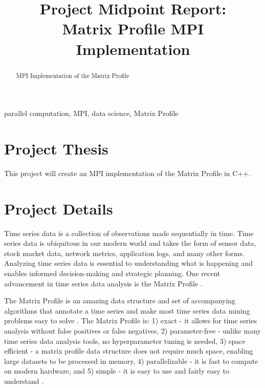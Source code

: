 \documentclass[conference]{IEEEtran}
\begin{document}
\title{Project Midpoint Report:\\Matrix Profile MPI Implementation}

\author{
}


\maketitle
\begin{abstract}
MPI Implementation of the Matrix Profile
\end{abstract}

\begin{IEEEkeywords}
parallel computation, MPI, data science, Matrix Profile
\end{IEEEkeywords}

\section{Project Thesis}
This project will create an MPI implementation of the Matrix Profile in C++.

\section{Project Details}
Time series data is a collection of observations made sequentially in time.  Time series data is ubiquitous in our modern world and takes the form of sensor data, stock market data, network metrics, application logs, and many other forms.  Analyzing time series data is essential to understanding what is happening and enables informed decision-making and strategic planning.  One recent advancement in time series data analysis is the Matrix Profile \cite{MatrixProfile1}. 

The Matrix Profile is an amazing data structure and set of accompanying algorithms that annotate a time series and make most time series data mining problems easy to solve \cite{MatrixProfile2}. The Matrix Profile is:  1) exact - it allows for time series analysis without false positives or false negatives, 2) parameter-free - unlike many time series data analysis tools, no hyperparameter tuning is needed, 3) space efficient - a matrix profile data structure does not require much space, enabling large datasets to be processed in memory, 4) parallelizable - it is fast to compute on modern hardware, and 5) simple - it is easy to use and fairly easy to understand \cite{Keogh}.   
\end{document}
